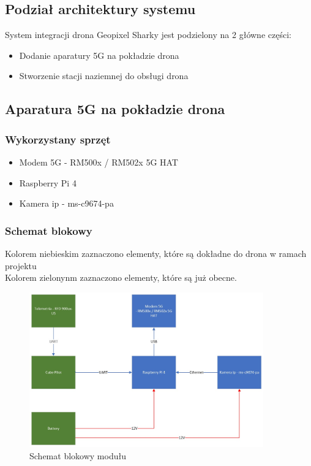 \documentclass{article}
\begin{document}
\subsection{Podział architektury systemu}
System integracji drona Geopixel Sharky jest podzielony na 2 główne części:
\begin{itemize}
    \item Dodanie aparatury 5G na pokładzie drona
    \item Stworzenie stacji naziemnej do obsługi drona
\end{itemize}

\subsection{Aparatura 5G na pokładzie drona}
\subsubsection{Wykorzystany sprzęt}

\begin{itemize}
    \item Modem 5G - RM500x / RM502x 5G HAT
    \item Raspberry Pi 4
    \item Kamera ip - ms-c9674-pa
\end{itemize}

\subsubsection{Schemat blokowy}
Kolorem niebieskim zaznaczono elementy, które są dokładne do drona w ramach projektu\\
Kolorem zielonynm zaznaczono elementy, które są już obecne.

\begin{figure}[H]
    \centering
    \includegraphics[width=0.9\textwidth]{nadronie.jpg}
    \caption{Schemat blokowy modułu}
\end{figure}
\end{document}

